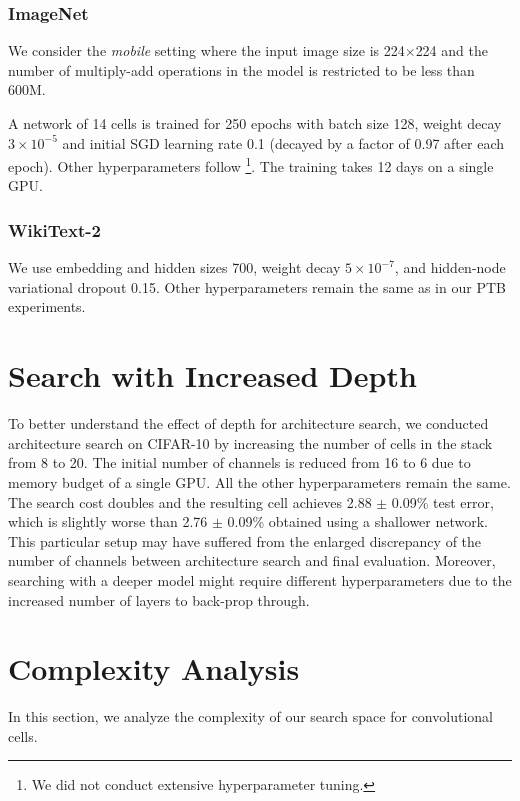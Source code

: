 \documentclass{article}
\begin{document}
\subsubsection{ImageNet}
\label{sec:eval-imagenet}
We consider the \emph{mobile} setting
where the input image size is 224$\times$224
and the number of multiply-add operations in the model is restricted to be less than 600M.

A network of 14 cells is trained for 250 epochs
with batch size 128, weight decay $3 \times 10^{-5}$ and initial SGD learning rate 0.1 (decayed by a factor of 0.97 after each epoch).
Other hyperparameters follow \cite{zoph2017learning, real2018regularized, liu2017progressive}\footnote{We did not conduct extensive hyperparameter tuning.}.
The training takes 12 days on a single GPU.

\subsubsection{WikiText-2}
\label{sec:eval-wt2}
We use embedding and hidden sizes 700, weight decay $5 \times 10^{-7}$,
and hidden-node variational dropout 0.15.
Other hyperparameters remain the same as in our PTB experiments.

\section{Search with Increased Depth}
To better understand the effect of depth for architecture search,
we conducted architecture search on CIFAR-10 by increasing the number of cells in the stack from 8 to 20.
The initial number of channels is reduced from 16 to 6 due to memory budget of a single GPU. All the other hyperparameters remain the same. The search cost doubles and the resulting cell achieves 2.88 $\pm$ 0.09\% test error, which is slightly worse than 2.76 $\pm$ 0.09\% obtained using a shallower network.
This particular setup may have suffered from the enlarged discrepancy of the number of channels between architecture search and final evaluation.
Moreover, searching with a deeper model might require different hyperparameters due to the increased number of layers to back-prop through. 


\section{Complexity Analysis}
In this section,
we analyze the complexity of our search space for convolutional cells.
\end{document}
